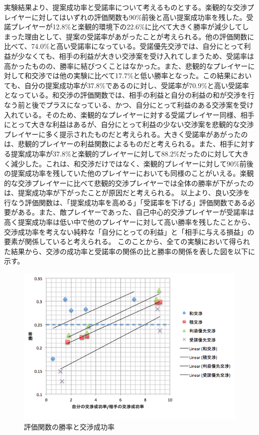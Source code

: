 \documentclass[a4, 10pt,dvipdfmx]{jsarticle}
\begin{document}
実験結果より、提案成功率と受諾率について考えるものとする。楽観的な交渉プレイヤーに対してはいずれの評価関数も90\%前後と高い提案成功率を残した。受諾プレイヤーが12.8\%と楽観的環境下の22.6\%に比べて大きく勝率が減少してしまった理由として、提案の受諾率があがったことが考えられる。他の評価関数に比べて、74.0\%と高い受諾率になっている。受諾優先交渉では、自分にとって利益が少なくても、相手の利益が大きい交渉案を受け入れてしまうため、受諾率は高かったものの、勝率に結びつくことはなかった。また、悲観的なプレイヤーに対して和交渉では他の実験に比べて17.7\%と低い勝率となった。この結果においても、自分の提案成功率が37.8\%であるのに対し、受諾率が70.9\%と高い受諾率となっている。和交渉の評価関数では、相手の利益と自分の利益の和が交渉を行なう前と後でプラスになっている、かつ、自分にとって利益のある交渉案を受け入れている。そのため、楽観的なプレイヤーに対する受諾プレイヤー同様、相手にとって大きな利益はあるが、自分にとって利益の少ない交渉案を悲観的な交渉プレイヤーに多く提示されたものだと考えられる。大きく受諾率があがったのは、悲観的プレイヤーの利益関数によるものだと考えられる。また、相手に対する提案成功率が37.8\%と楽観的プレイヤーに対して88.2\%だったのに対して大きく減少した。これは、和交渉だけではなく、楽観的プレイヤーに対して90\%前後の提案成功率を残していた他のプレイヤーにおいても同様のことがいえる。楽観的な交渉プレイヤーに比べて悲観的交渉プレイヤーでは全体の勝率が下がったのは、提案成功率が下がったことが原因だと考えられる。
以上より、良い交渉を行なう評価関数は、「提案成功率を高める」「受諾率を下げる」評価関数である必要がある。また、敵プレイヤーであった、自己中心的交渉プレイヤーが受諾率は高く提案成功率は低い中で他のプレイヤーに対して高い勝率を残したことから、交渉成功率を考えない純粋な「自分にとっての利益」と「相手に与える損益」の要素が関係していると考えられる。
このことから、全ての実験において得られた結果から、交渉の成功率と受諾率の関係の比と勝率の関係を表した図を以下に示す。



\begin{figure}[t]
    \begin{center}
      \includegraphics[width=120mm]{img/relation_winrate.png}
    \end{center}
    \caption{評価関数の勝率と交渉成功率}
    \label{win_rate}
\end{figure}
\end{document}
